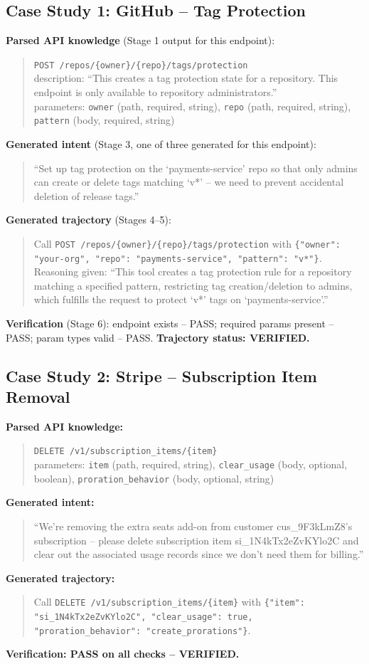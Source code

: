 \documentclass[11pt]{article}
\begin{document}
\subsection{Case Study 1: GitHub -- Tag Protection}
\textbf{Parsed API knowledge} (Stage 1 output for this endpoint):
\begin{quote}
\small
\texttt{POST /repos/\{owner\}/\{repo\}/tags/protection} \\
description: ``This creates a tag protection state for a repository. This endpoint is only
available to repository administrators.'' \\
parameters: \texttt{owner} (path, required, string), \texttt{repo} (path, required, string),
\texttt{pattern} (body, required, string)
\end{quote}
\textbf{Generated intent} (Stage 3, one of three generated for this endpoint):
\begin{quote}
\small ``Set up tag protection on the `payments-service' repo so that only admins can create or
delete tags matching `v*' -- we need to prevent accidental deletion of release tags.''
\end{quote}
\textbf{Generated trajectory} (Stages 4--5):
\begin{quote}
\small
Call \texttt{POST /repos/\{owner\}/\{repo\}/tags/protection} with
\texttt{\{"owner": "your-org", "repo": "payments-service", "pattern": "v*"\}}. \\
Reasoning given: ``This tool creates a tag protection rule for a repository matching a specified
pattern, restricting tag creation/deletion to admins, which fulfills the request to protect `v*'
tags on `payments-service'.''
\end{quote}
\textbf{Verification} (Stage 6): endpoint exists -- PASS; required params present -- PASS; param
types valid -- PASS. \textbf{Trajectory status: VERIFIED.}

\subsection{Case Study 2: Stripe -- Subscription Item Removal}
\textbf{Parsed API knowledge:}
\begin{quote}
\small
\texttt{DELETE /v1/subscription\_items/\{item\}} \\
parameters: \texttt{item} (path, required, string), \texttt{clear\_usage} (body, optional,
boolean), \texttt{proration\_behavior} (body, optional, string)
\end{quote}
\textbf{Generated intent:}
\begin{quote}
\small ``We're removing the extra seats add-on from customer cus\_9F3kLmZ8's subscription --
please delete subscription item si\_1N4kTx2eZvKYlo2C and clear out the associated usage records
since we don't need them for billing.''
\end{quote}
\textbf{Generated trajectory:}
\begin{quote}
\small
Call \texttt{DELETE /v1/subscription\_items/\{item\}} with
\texttt{\{"item": "si\_1N4kTx2eZvKYlo2C", "clear\_usage": true, "proration\_behavior":
"create\_prorations"\}}.
\end{quote}
\textbf{Verification: PASS on all checks -- VERIFIED.}
\end{document}
